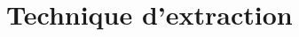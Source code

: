 \documentclass[a4paper,12pt]{article}
\begin{document}









% 

\newpage
\AtNextBibliography{\small}
\printbibliography
{}
\clearpage


\appendix


\section{Technique d'extraction}

\end{document}
